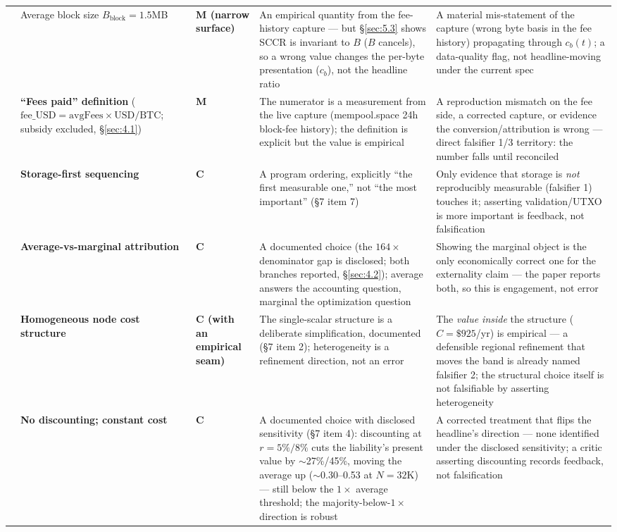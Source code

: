 \documentclass[11pt]{article}
\begin{document}
\begin{table}[h]
\begin{tabular}{@{}>{\raggedright\arraybackslash}p{0.7cm}>{\raggedright\arraybackslash}p{2.9cm}>{\raggedright\arraybackslash}p{2.0cm}>{\raggedright\arraybackslash}p{5.3cm}>{\raggedright\arraybackslash}p{5.0cm}@{}}
4 & Average block size $B_{\mathrm{block}} = 1.5$MB & \textbf{M (narrow surface)} & An empirical quantity from the fee-history capture --- but \S\ref{sec:5.3} shows SCCR is invariant to $B$ ($B$ cancels), so a wrong value changes the per-byte presentation ($c_b$), not the headline ratio & A material mis-statement of the capture (wrong byte basis in the fee history) propagating through $c_b(t)$; a data-quality flag, not headline-moving under the current spec\\
5 & \textbf{``Fees paid'' definition} ($\mathrm{fee\_USD} = \mathrm{avgFees} \times \mathrm{USD/BTC}$; subsidy excluded, \S\ref{sec:4.1}) & \textbf{M} & The numerator is a measurement from the live capture (mempool.space 24h block-fee history); the definition is explicit but the value is empirical & A reproduction mismatch on the fee side, a corrected capture, or evidence the conversion/attribution is wrong --- direct falsifier 1/3 territory: the number falls until reconciled\\
6 & \textbf{Storage-first sequencing} & \textbf{C} & A program ordering, explicitly ``the first measurable one,'' not ``the most important'' (\S7 item 7) & Only evidence that storage is \emph{not} reproducibly measurable (falsifier 1) touches it; asserting validation/UTXO is more important is feedback, not falsification\\
7 & \textbf{Average-vs-marginal attribution} & \textbf{C} & A documented choice (the $164\times$ denominator gap is disclosed; both branches reported, \S\ref{sec:4.2}); average answers the accounting question, marginal the optimization question & Showing the marginal object is the only economically correct one for the externality claim --- the paper reports both, so this is engagement, not error\\
8 & \textbf{Homogeneous node cost structure} & \textbf{C (with an empirical seam)} & The single-scalar structure is a deliberate simplification, documented (\S7 item 2); heterogeneity is a refinement direction, not an error & The \emph{value inside} the structure ($C = \$925$/yr) is empirical --- a defensible regional refinement that moves the band is already named falsifier 2; the structural choice itself is not falsifiable by asserting heterogeneity\\
9 & \textbf{No discounting; constant cost} & \textbf{C} & A documented choice with disclosed sensitivity (\S7 item 4): discounting at $r=5\%/8\%$ cuts the liability's present value by $\sim$27\%/45\%, moving the average up ($\sim$0.30--0.53 at $N=32$K) --- still below the $1\times$ average threshold; the majority-below-$1\times$ direction is robust & A corrected treatment that flips the headline's direction --- none identified under the disclosed sensitivity; a critic asserting discounting records feedback, not falsification\\
\bottomrule
\end{tabular}
\end{table}
\end{document}

